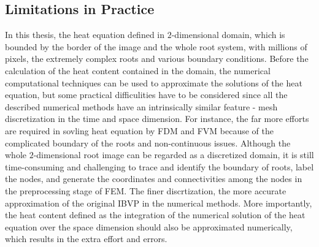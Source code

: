 \subsection{Limitations in Practice}



In this thesis, the heat equation defined in $2$-dimensional domain,
which is bounded by the border of the image and the whole root system,
with millions of pixels, the extremely complex roots and various
boundary conditions. Before the calculation of the heat content
contained in the domain, the numerical computational techniques can be
used to approximate the solutions of the heat equation, but some
practical difficulities have to be considered since all the described
numerical methods have an intrinsically similar feature - mesh
discretization in the time and space dimension. For instance, the far
more efforts are required in sovling heat equation by FDM and FVM
because of the complicated boundary of the roots and non-continuous
issues. Although the whole $2$-dimensional root image can be regarded
as a discretized domain, it is still time-consuming and challenging to
trace and identify the boundary of roots, label the nodes, and
generate the coordinates and connectivities among the nodes in the
preprocessing stage of FEM. The finer discrtization, the more accurate
approximation of the original IBVP in the numerical methods. More
importantly, the heat content defined as the integration of the
numerical solution of the heat equation over the space dimension
should also be approximated numerically, which results in the extra
effort and errors.
